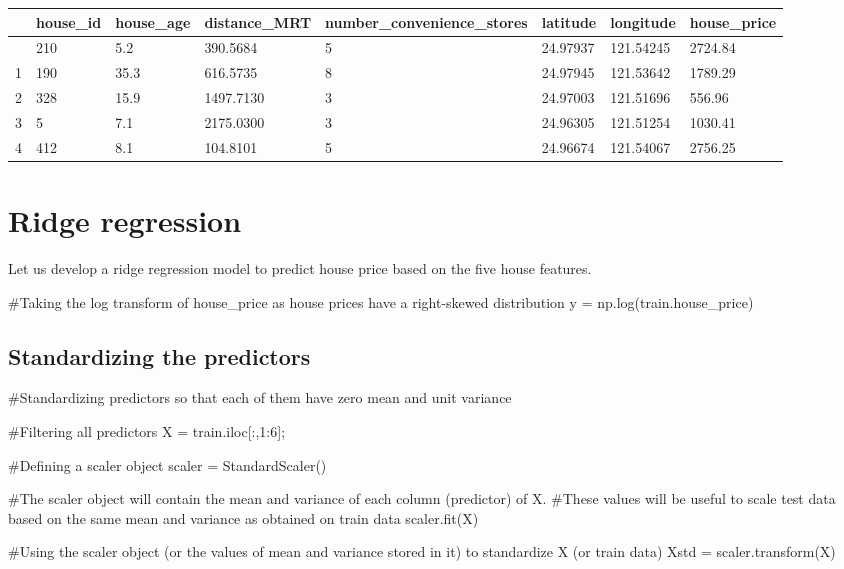 \documentclass[
  letterpaper,
  DIV=11,
  numbers=noendperiod]{scrreprt}
\newenvironment{Shaded}{\begin{snugshade}}{\end{snugshade}}
\newcommand{\CommentTok}[1]{\textcolor[rgb]{0.37,0.37,0.37}{#1}}
\newcommand{\DecValTok}[1]{\textcolor[rgb]{0.68,0.00,0.00}{#1}}
\newcommand{\NormalTok}[1]{\textcolor[rgb]{0.00,0.23,0.31}{#1}}
\newcommand{\OperatorTok}[1]{\textcolor[rgb]{0.37,0.37,0.37}{#1}}
\begin{document}
\begin{longtable}[]{@{}llllllll@{}}
\toprule\noalign{}
& house\_id & house\_age & distance\_MRT & number\_convenience\_stores &
latitude & longitude & house\_price \\
\midrule\noalign{}
\endhead
\bottomrule\noalign{}
\endlastfoot
0 & 210 & 5.2 & 390.5684 & 5 & 24.97937 & 121.54245 & 2724.84 \\
1 & 190 & 35.3 & 616.5735 & 8 & 24.97945 & 121.53642 & 1789.29 \\
2 & 328 & 15.9 & 1497.7130 & 3 & 24.97003 & 121.51696 & 556.96 \\
3 & 5 & 7.1 & 2175.0300 & 3 & 24.96305 & 121.51254 & 1030.41 \\
4 & 412 & 8.1 & 104.8101 & 5 & 24.96674 & 121.54067 & 2756.25 \\
\end{longtable}

\section{Ridge regression}\label{ridge-regression}

Let us develop a ridge regression model to predict house price based on
the five house features.

\begin{Shaded}
\begin{Highlighting}[]
\CommentTok{\#Taking the log transform of house\_price as house prices have a right{-}skewed distribution}
\NormalTok{y }\OperatorTok{=}\NormalTok{ np.log(train.house\_price)}
\end{Highlighting}
\end{Shaded}

\subsection{Standardizing the
predictors}\label{standardizing-the-predictors}

\begin{Shaded}
\begin{Highlighting}[]
\CommentTok{\#Standardizing predictors so that each of them have zero mean and unit variance}

\CommentTok{\#Filtering all predictors}
\NormalTok{X }\OperatorTok{=}\NormalTok{ train.iloc[:,}\DecValTok{1}\NormalTok{:}\DecValTok{6}\NormalTok{]}\OperatorTok{;} 

\CommentTok{\#Defining a scaler object}
\NormalTok{scaler }\OperatorTok{=}\NormalTok{ StandardScaler()}

\CommentTok{\#The scaler object will contain the mean and variance of each column (predictor) of X. }
\CommentTok{\#These values will be useful to scale test data based on the same mean and variance as obtained on train data}
\NormalTok{scaler.fit(X)}

\CommentTok{\#Using the scaler object (or the values of mean and variance stored in it) to standardize X (or train data)}
\NormalTok{Xstd }\OperatorTok{=}\NormalTok{ scaler.transform(X)}
\end{Highlighting}
\end{Shaded}
\end{document}
